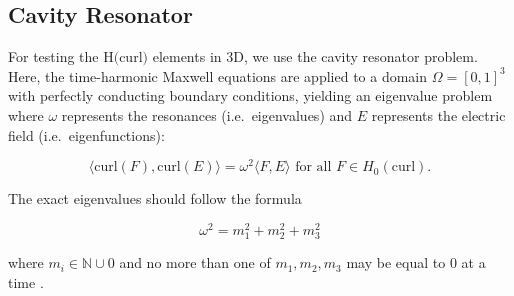 \documentclass[manuscript,screen]{acmart}
\newcommand{\R}{\mathbb{R}}
\newcommand{\akg}[1]{\textcolor{blue}{\textbf{AG:} #1}}
\begin{document}

  \subsection{Cavity Resonator}

\noindent For testing the H$($curl$)$ elements in 3D, we use the cavity resonator problem.  Here, the time-harmonic Maxwell equations are applied to a domain $\Omega = [0,1]^3$ with perfectly conducting boundary conditions, yielding an eigenvalue problem where $\omega$ represents the resonances (i.e.\ eigenvalues) and $E$ represents the electric field (i.e.\ eigenfunctions):


\begin{equation}
    \langle \text{curl}(F), \text{curl}(E) \rangle = \omega^2 \langle F, E \rangle \text{ for all } F \in H_0(\text{curl}).
\end{equation}


\noindent The exact eigenvalues should follow the formula

\[ \omega^2 = m_1^2 + m_2^2 + m_3^2 \]

\noindent where $m_i \in \mathbb{N} \cup {0}$ and no more than one of $m_1, m_2, m_3$ may be equal to $0$ at a time \cite{rognes2010efficient}.

\end{document}
